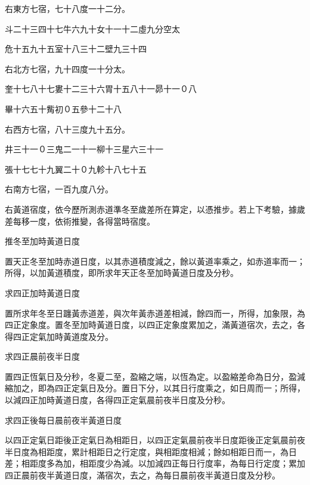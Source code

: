\begin{pinyinscope}
 右東方七宿，七十八度一十二分。



 斗二十三四十七牛六九十女十一十二虛九分空太



 危十五九十五室十八三十二壁九三十四



 右北方七宿，九十四度一十分太。



 奎十七八十七婁十二三十六胃十五八十一昴十一０八



 畢十六五十觜初０五參十二十八



 右西方七宿，八十三度九十五分。



 井三十一０三鬼二一十一柳十三星六三十一



 張十七七十九翼二十０九軫十八七十五



 右南方七宿，一百九度八分。



 右黃道宿度，依今歷所測赤道準冬至歲差所在算定，以憑推步。若上下考驗，據歲差每移一度，依術推變，各得當時宿度。



 推冬至加時黃道日度



 置天正冬至加時赤道日度，以其赤道積度減之，餘以黃道率乘之，如赤道率而一；所得，以加黃道積度，即所求年天正冬至加時黃道日度及分秒。



 求四正加時黃道日度



 置所求年冬至日躔黃赤道差，與次年黃赤道差相減，餘四而一，所得，加象限，為四正定象度。置冬至加時黃道日度，以四正定象度累加之，滿黃道宿次，去之，各得四正定氣加時黃道度及分。



 求四正晨前夜半日度



 置四正恆氣日及分秒，冬夏二至，盈縮之端，以恆為定。以盈縮差命為日分，盈減縮加之，即為四正定氣日及分。置日下分，以其日行度乘之，如日周而一；所得，以減四正加時黃道日度，各得四正定氣晨前夜半日度及分秒。



 求四正後每日晨前夜半黃道日度



 以四正定氣日距後正定氣日為相距日，以四正定氣晨前夜半日度距後正定氣晨前夜半日度為相距度，累計相距日之行定度，與相距度相減；餘如相距日而一，為日差；相距度多為加，相距度少為減。以加減四正每日行度率，為每日行定度；累加四正晨前夜半黃道日度，滿宿次，去之，為每日晨前夜半黃道日度及分秒。




\end{pinyinscope}
